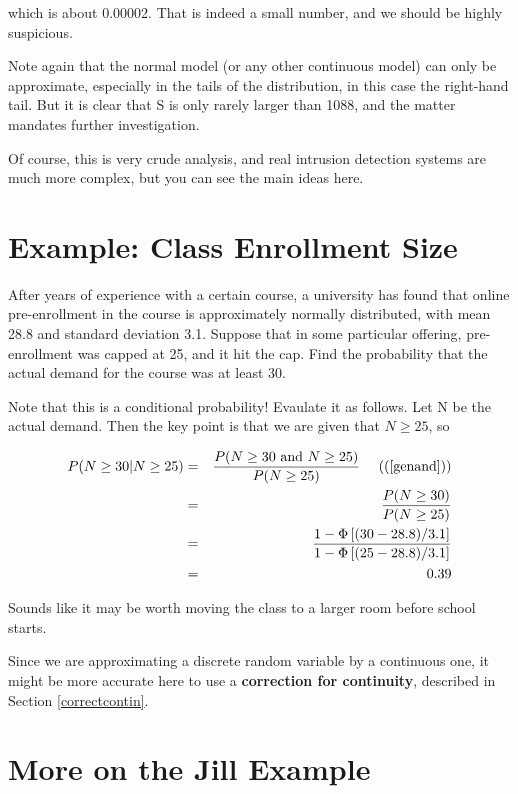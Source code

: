which is about 0.00002.  That is indeed a small number, and we should be
highly suspicious.

Note again that the normal model (or any other continuous model) can
only be approximate, especially in the tails of the distribution, in
this case the right-hand tail.  But it is clear that S is only rarely
larger than 1088, and the matter mandates further investigation.

Of course, this is very crude analysis, and real intrusion detection
systems are much more complex, but you can see the main ideas here.

\section{Example:  Class Enrollment Size}
\label{classize}

After years of experience with a certain course, a university has found
that online pre-enrollment in the course is approximately normally
distributed, with mean 28.8 and standard deviation 3.1.  Suppose that in
some particular offering, pre-enrollment was capped at 25, and it hit
the cap.  Find the probability that the actual demand for the course was
at least 30.

Note that this is a conditional probability!  Evaulate it as follows.
Let N be the actual demand.  Then the key point is that we are given that
$N \geq 25$, so

\begin{eqnarray}
P(N \geq 30 | N \geq 25) 
&=&  
\frac
{P(N \geq 30 \textrm{ and } N \geq 25)}
{P(N \geq 25)} ~~~~ ((\ref{genand})) \\
&=&  
\frac
{P(N \geq 30)}
{P(N \geq 25)} \\
&=& 
\frac
{1 -\Phi \left [ (30-28.8)/3.1 \right ] }
{1 -\Phi \left [ (25-28.8)/3.1 \right ] } \\
&=& 0.39
\end{eqnarray}

Sounds like it may be worth moving the class to a larger room before
school starts.

Since we are approximating a discrete random variable by a continuous
one, it might be more accurate here to use a {\bf correction for
continuity}, described in Section \ref{correctcontin}.

\section{More on the Jill Example}

